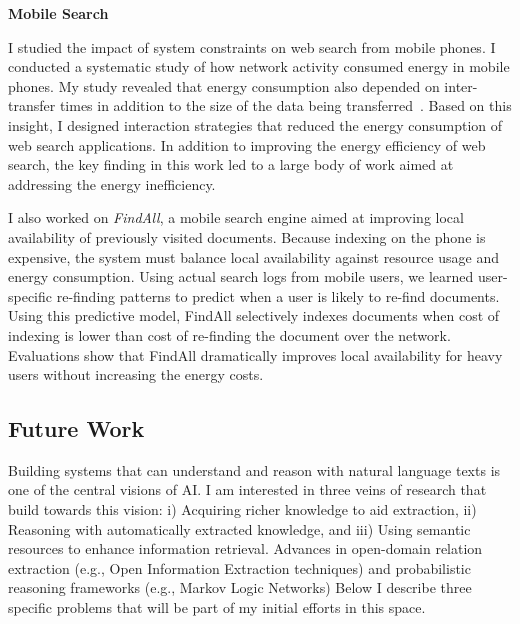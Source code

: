 \documentclass[a4paper,11pt,onecolumn]{article}
\begin{document}
{\bf Mobile Search}

I studied the impact of system constraints on web search from mobile phones. I conducted a systematic study of how network activity consumed energy in mobile phones. My study revealed that energy consumption also depended on inter-transfer times in addition to the size of the data being transferred~\cite{balasubramanian-imc09}. Based on this insight, I designed interaction strategies that reduced the energy consumption of web search applications. In addition to improving the energy efficiency of web search, the key finding in this work led to a large body of work aimed at addressing the energy inefficiency.

I also worked on {\em FindAll}, a mobile search engine aimed at improving local availability of previously visited documents. Because indexing on the phone is expensive, the system must balance local availability against resource usage and energy consumption. Using actual search logs from mobile users, we learned user-specific re-finding patterns to predict when a user is likely to re-find documents. Using this predictive model, FindAll selectively indexes documents when cost of indexing is lower than cost of re-finding the document over the network. Evaluations show that FindAll dramatically improves local availability for heavy users without increasing the energy costs.

\subsection*{Future Work}

Building systems that can understand and reason with natural language texts is one of the central visions of AI. 	 
I am interested in three veins of research that build towards this vision: i) Acquiring richer knowledge to aid extraction, ii) Reasoning with automatically extracted knowledge, and iii) Using semantic resources to enhance information retrieval. Advances in open-domain relation extraction (e.g., Open Information Extraction techniques) and probabilistic reasoning frameworks (e.g., Markov Logic Networks) 
Below I describe three specific problems that will be part of my initial efforts in this space.
\end{document}
